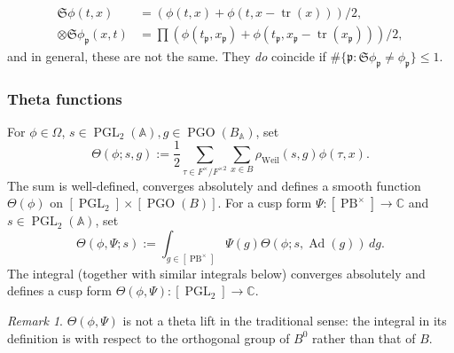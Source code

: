 \documentclass[reqno,10pt]{amsart}
\theoremstyle{plain} %
\theoremstyle{definition}
\theoremstyle{plain} %
\theoremstyle{remark}
\newtheorem*{remark*}            {Remark}
\theoremstyle{itplain} %
\theoremstyle{remark} %
\renewcommand{\leq}{\leqslant}
\numberwithin{equation}{section}
\DeclareMathOperator{\PGO}{PGO}
\DeclareMathOperator{\Ad}{Ad}
\def\PB{\operatorname{PB}}
\def\PGL{\operatorname{PGL}}
\DeclareMathOperator{\Weil}{Weil}
\DeclareMathOperator{\tr}{tr}
\begin{document}
\begin{align*}
  \mathfrak{S} \phi (t,x)
  &= (\phi (t,x) + \phi (t,x -
    \tr(x)))/2,
  \\
  \otimes \mathfrak{S} \phi_\mathfrak{p}(x,t)
  &= \prod  (\phi (t_\mathfrak{p},x_\mathfrak{p}) + \phi (t_\mathfrak{p},x_\mathfrak{p} -
    \tr(x_\mathfrak{p} )))/2,
\end{align*}
and in general, these are not the same.  They \emph{do} coincide if $\# \{ \mathfrak{p} : \mathfrak{S} \phi_\mathfrak{p} \neq \phi_\mathfrak{p} \} \leq 1$.

\subsubsection{Theta functions}\label{sec:35ac3e570a}
For $\phi \in \Omega$, $s \in \PGL_2(\mathbb{A}), g \in \PGO(B_\mathbb{A})$, set
\begin{equation}
  \label{defn:theta-knerle-for-Omega}
  \Theta(\phi;s,g)
  :=
  \frac{1}{2} \sum_{\tau \in F^\times / F^{\times 2}}
  \sum_{x \in B}
  \rho_{\Weil}(s,g)
  \phi(\tau,x).
\end{equation}
The sum is well-defined, converges absolutely and defines a smooth function $\Theta(\phi)$ on $[\PGL_2] \times [\PGO(B)]$.  For a cusp form $\Psi : [\PB^\times] \rightarrow \mathbb{C}$ and $s \in \PGL_2(\mathbb{A})$, set
\begin{equation}
  \Theta(\phi,\Psi;s) := \int_{g \in [\PB^\times]} \Psi(g) \Theta(\phi;s,\Ad(g)) \, d g.
\end{equation}
The integral (together with similar integrals below) converges absolutely and defines a cusp form $\Theta(\phi,\Psi) : [\PGL_2] \rightarrow \mathbb{C}$.

\begin{remark*}
  $\Theta(\phi,\Psi)$ is not a theta lift in the traditional sense: the integral in its definition is with respect to the orthogonal group of $B^0$ rather than that of $B$.
\end{remark*}
\end{document}
